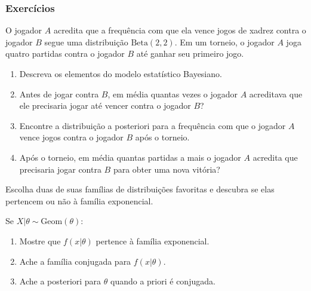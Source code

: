 \subsubsection*{Exercícios}

\begin{exercise}
 O jogador $A$ acredita que a frequência com que 
 ela vence jogos de xadrez contra o jogador $B$
 segue uma distribuição $\text{Beta}(2,2)$.
 Em um torneio, o jogador $A$ joga quatro partidas contra
 o jogador $B$ até ganhar seu primeiro jogo.
 \begin{enumerate}[label=(\alph*)]
  \item Descreva os elementos do modelo estatístico Bayesiano.
  \item Antes de jogar contra $B$, em média quantas vezes
  o jogador $A$ acreditava que ele precisaria jogar
  até vencer contra o jogador $B$?
  \item Encontre a distribuição a posteriori para
 a frequência com que o jogador $A$ vence
 jogos contra o jogador $B$ após o torneio.
 \item Após o torneio, em média quantas partidas a mais
 o jogador $A$ acredita que precisaria jogar contra $B$
 para obter uma nova vitória?
 \end{enumerate}
\end{exercise}

\begin{exercise}
 Escolha duas de suas famílias de
 distribuições favoritas e descubra se
 elas pertencem ou não à família exponencial.
\end{exercise}

\begin{exercise}
 Se $X|\theta \sim \text{Geom}(\theta)$:
 \begin{enumerate}[label=(\alph*)]
  \item Mostre que $f(x|\theta)$ pertence à
  família exponencial.
  \item Ache a família conjugada para $f(x|\theta)$.
  \item Ache a posteriori para $\theta$ quando
  a priori é conjugada.
 \end{enumerate} 
\end{exercise}

